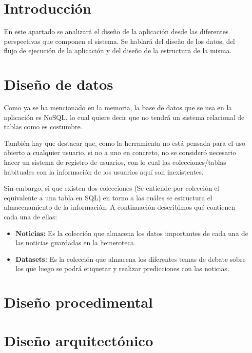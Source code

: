 
\section{Introducción}

En este apartado se analizará el diseño de la aplicación desde las diferentes perspectivas que componen el sistema. Se hablará del diseño de los datos, del flujo de ejecución de la aplicación y del diseño de la estructura de la misma.

\section{Diseño de datos}

Como ya se ha mencionado en la memoria, la base de datos que se usa en la aplicación es NoSQL, lo cual quiere decir que no tendrá un sistema relacional de tablas como es costumbre. 

También hay que destacar que, como la herramienta no está pensada para el uso abierto a cualquier usuario, si no a uno en concreto, no se consideró necesario hacer un sistema de registro de usuarios, con lo cual las colecciones/tablas habituales con la información de los usuarios aquí son inexistentes.

Sin embargo, si que existen dos colecciones (Se entiende por colección el equivalente a una tabla en SQL) en torno a las cuáles se estructura el almacenamiento de la información. A continuación describimos qué contienen cada una de ellas:

\begin{itemize}

\item \textbf{Noticias:} Es la colección que almacena los datos importantes de cada una de las noticias guardadas en la hemeroteca.

\item \textbf{Datasets:} Es la colección que almacena los diferentes temas de debate sobre los que luego se podrá etiquetar y realizar predicciones con las noticias. 

\end{itemize}

\section{Diseño procedimental}

\section{Diseño arquitectónico}


